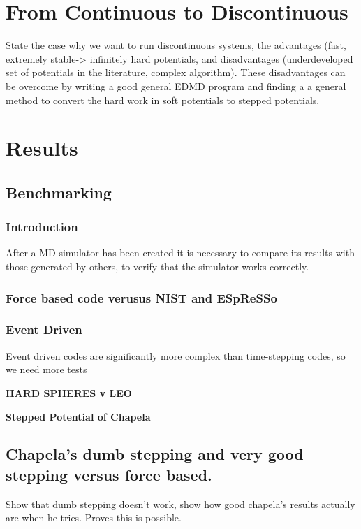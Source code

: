 \documentclass[12pt]{UoAthesis}
\begin{document}
\chapter{From Continuous to Discontinuous}
State the case why we want to run discontinuous systems, the
advantages (fast, extremely stable-> infinitely hard potentials, and
disadvantages (underdeveloped set of potentials in the literature,
complex algorithm). These disadvantages can be overcome by writing a
good general EDMD program and finding a a general method to convert
the hard work in soft potentials to stepped potentials. 


\chapter{Results} 

\section{Benchmarking} 

\subsection{Introduction} 
After a MD simulator has been created it is necessary to compare its
results with those generated by others, to verify that the simulator
works correctly.

\subsection{Force based code verusus NIST and ESpReSSo}

\subsection{Event Driven}
Event driven codes are significantly more complex than time-stepping codes, so we need more tests

{\bf HARD SPHERES v LEO}

{\bf Stepped Potential of Chapela}

\section{Chapela's dumb stepping and very good stepping versus force based. }

Show that dumb stepping doesn't work, show how good chapela's results actually are when he tries. Proves this is possible.
\end{document}
